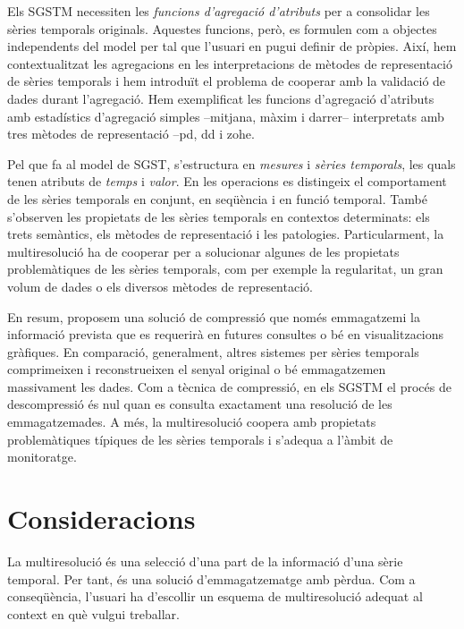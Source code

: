 Els \gls{SGSTM} necessiten les \emph{funcions d'agregació d'atributs}
per a consolidar les sèries temporals originals.  Aquestes funcions,
però, es formulen com a objectes independents del model per tal que
l'usuari en pugui definir de pròpies.  Així, hem contextualitzat les
agregacions en les interpretacions de mètodes de representació de
sèries temporals i hem introduït el problema de cooperar amb la
validació de dades durant l'agregació.  Hem exemplificat les funcions
d'agregació d'atributs amb estadístics d'agregació simples --mitjana,
màxim i darrer-- interpretats amb tres mètodes de representació
--\gls{pd}, \gls{dd} i \gls{zohe}.




Pel que fa al model de \gls{SGST}, s'estructura en \emph{mesures} i
\emph{sèries temporals}, les quals tenen atributs de \emph{temps} i
\emph{valor}. En les operacions es distingeix el comportament de les
sèries temporals en conjunt, en seqüència i en funció temporal.  També
s'observen les propietats de les sèries temporals en contextos
determinats: els trets semàntics, els mètodes de representació i les
patologies.  Particularment, la multiresolució ha de cooperar per a
solucionar algunes de les propietats problemàtiques de les sèries
temporals, com per exemple la regularitat, un gran volum de dades o
els diversos mètodes de representació.


En resum, proposem una solució de compressió que només emmagatzemi la
informació prevista que es requerirà en futures consultes o bé en
visualitzacions gràfiques.  En comparació, generalment, altres
sistemes per sèries temporals comprimeixen i reconstrueixen el senyal
original o bé emmagatzemen massivament les dades.  Com a tècnica de
compressió, en els \gls{SGSTM} el procés de descompressió és nul quan
es consulta exactament una resolució de les emmagatzemades.  A més, la
multiresolució coopera amb propietats problemàtiques típiques de les
sèries temporals i s'adequa a l'àmbit de monitoratge.


\section{Consideracions}

La multiresolució és una selecció d'una part de la informació d'una
sèrie temporal. Per tant, és una solució d'emmagatzematge amb
pèrdua. Com a conseqüència, l'usuari ha d'escollir un esquema de
multiresolució adequat al context en què vulgui treballar.



